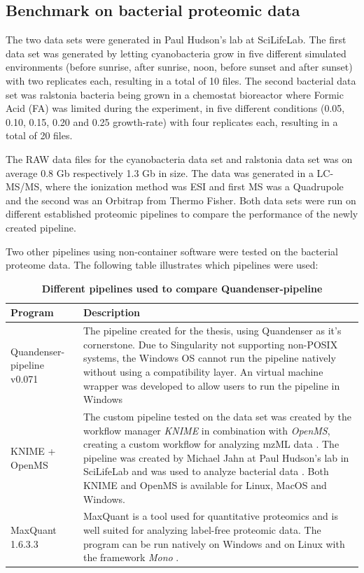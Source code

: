 \subsection{Benchmark on bacterial proteomic data}
The two data sets were generated in Paul Hudson's lab at SciLifeLab. The first data set was generated by letting cyanobacteria grow in five different simulated environments (before sunrise, after sunrise, noon, before sunset and after sunset) with two replicates each, resulting in a total of 10 files. The second bacterial data set was ralstonia bacteria being grown in a chemostat bioreactor where Formic Acid (FA) was limited during the experiment, in five different conditions (0.05, 0.10, 0.15, 0.20 and 0.25 growth-rate) with four replicates each, resulting in a total of 20 files.

The RAW data files for the cyanobacteria data set and ralstonia data set was on average 0.8 Gb respectively 1.3 Gb in size. The data was generated in a LC-MS/MS, where the ionization method was ESI and first MS was a Quadrupole and the second was an Orbitrap from Thermo Fisher. Both data sets were run on different established proteomic pipelines to compare the performance of the newly created pipeline.

Two other pipelines using non-container software were tested on the bacterial proteome data. The following table illustrates which pipelines were used:

\newcommand{\textone}{\small The pipeline created for the thesis, using Quandenser as it's cornerstone. Due to Singularity not supporting non-POSIX systems, the Windows OS cannot run the pipeline natively without using a compatibility layer. An virtual machine wrapper was developed to allow users to run the pipeline in Windows}
\newcommand{\texttwo}{\small The custom pipeline tested on the data set was created by the workflow manager \textit{KNIME} in combination with \textit{OpenMS}, creating a custom workflow for analyzing mzML data \cite{knime} \cite{openms}. The pipeline was created by Michael Jahn at Paul Hudson's lab in SciLifeLab and was used to analyze bacterial data \cite{m-jahn-pipeline}. Both KNIME and OpenMS is available for Linux, MacOS and Windows.}
\newcommand{\textthree}{\small MaxQuant is a tool used for quantitative proteomics and is well suited for analyzing label-free proteomic data. The program can be run natively on Windows and on Linux with the framework \textit{Mono} \cite{maxquant} \cite{maxquant-installation}.}

\begin{table}[H]
\caption{\textbf{Different pipelines used to compare Quandenser-pipeline}}
\begin{center}
\begin{tabular}{|p{4cm}|p{9cm}|}
\hline
Program & Description \\ \hline \hline
Quandenser-pipeline v0.071 & \textone \\ \hline
KNIME + OpenMS & \texttwo \\ \hline
MaxQuant 1.6.3.3 & \textthree \\ \hline
\end{tabular}
\end{center}
\end{table}

